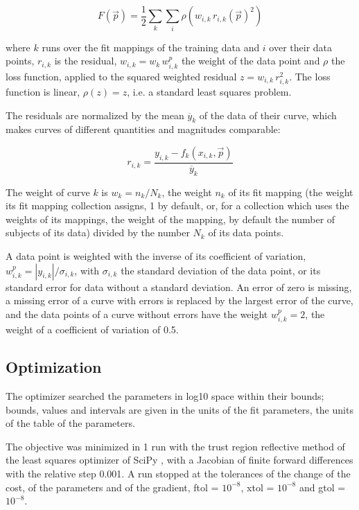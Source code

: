 \documentclass{article}
\begin{document}
\begin{equation}
F(\vec{p}) = \frac{1}{2} \sum_{k} \sum_{i} \rho\left(w_{i,k}\, r_{i,k}(\vec{p})^2\right)
\end{equation}

where $k$ runs over the fit mappings of the training data and $i$ over their data points, $r_{i,k}$ is the residual, $w_{i,k} = w_k\, w^{p}_{i,k}$ the weight of the data point and $\rho$ the loss function, applied to the squared weighted residual $z = w_{i,k}\, r_{i,k}^2$. The loss function is linear, $\rho(z) = z$, i.e. a standard least squares problem.

The residuals are normalized by the mean $\overline{y}_k$ of the data of their curve, which makes curves of different quantities and magnitudes comparable:

\begin{equation}
r_{i,k} = \frac{y_{i,k} - f_k(x_{i,k}, \vec{p})}{\overline{y}_k}
\end{equation}

The weight of curve $k$ is $w_k = n_k / N_k$, the weight $n_k$ of its fit mapping (the weight its fit mapping collection assigns, 1 by default, or, for a collection which uses the weights of its mappings, the weight of the mapping, by default the number of subjects of its data) divided by the number $N_k$ of its data points.

A data point is weighted with the inverse of its coefficient of variation, $w^{p}_{i,k} = |y_{i,k}| / \sigma_{i,k}$, with $\sigma_{i,k}$ the standard deviation of the data point, or its standard error for data without a standard deviation. An error of zero is missing, a missing error of a curve with errors is replaced by the largest error of the curve, and the data points of a curve without errors have the weight $w^{p}_{i,k} = 2$, the weight of a coefficient of variation of 0.5.

\subsection{Optimization}

The optimizer searched the parameters in log10 space within their bounds; bounds, values and intervals are given in the units of the fit parameters, the units of the table of the parameters.

The objective was minimized in 1 run with the trust region reflective method \cite{Branch1999} of the least squares optimizer of SciPy \cite{Virtanen2020}, with a Jacobian of finite forward differences with the relative step 0.001. A run stopped at the tolerances of the change of the cost, of the parameters and of the gradient, ftol = $10^{-8}$, xtol = $10^{-8}$ and gtol = $10^{-8}$.
\end{document}
